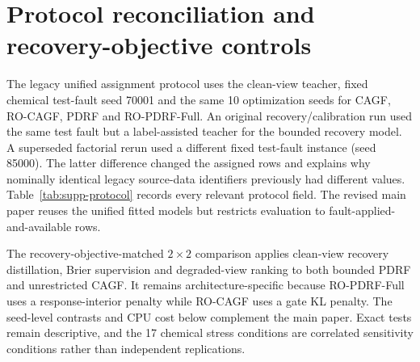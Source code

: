\documentclass[10pt]{article}
\begin{document}
\section{Protocol reconciliation and recovery-objective controls}

The legacy unified assignment protocol uses the clean-view teacher, fixed chemical test-fault seed 70001 and the same 10 optimization seeds for CAGF, RO-CAGF, PDRF and RO-PDRF-Full. An original recovery/calibration run used the same test fault but a label-assisted teacher for the bounded recovery model. A superseded factorial rerun used a different fixed test-fault instance (seed 85000). The latter difference changed the assigned rows and explains why nominally identical legacy source-data identifiers previously had different values. Table~\ref{tab:supp-protocol} records every relevant protocol field. The revised main paper reuses the unified fitted models but restricts evaluation to fault-applied-and-available rows.

\begin{table}[ht]
\centering
\caption{Reconciliation of the original formal run, superseded factorial rerun and legacy unified assignment protocol. CE denotes cross-entropy.}
\label{tab:supp-protocol}
\resizebox{\textwidth}{!}{}
\end{table}

The recovery-objective-matched $2\times2$ comparison applies clean-view recovery distillation, Brier supervision and degraded-view ranking to both bounded PDRF and unrestricted CAGF. It remains architecture-specific because RO-PDRF-Full uses a response-interior penalty while RO-CAGF uses a gate KL penalty. The seed-level contrasts and CPU cost below complement the main paper. Exact tests remain descriptive, and the 17 chemical stress conditions are correlated sensitivity conditions rather than independent replications.

\begin{table}[ht]
\centering
\caption{Recovery-objective-matched chemical and hydraulic contrasts. Positive values favour the first named method.}
\resizebox{\textwidth}{!}{}
\end{table}

\begin{table}[ht]
\centering
\caption{Recovery-objective-matched parameter counts and measured CPU costs. All four methods use three forward paths during training and one during inference.}
\resizebox{0.90\textwidth}{!}{}
\end{table}
\end{document}
